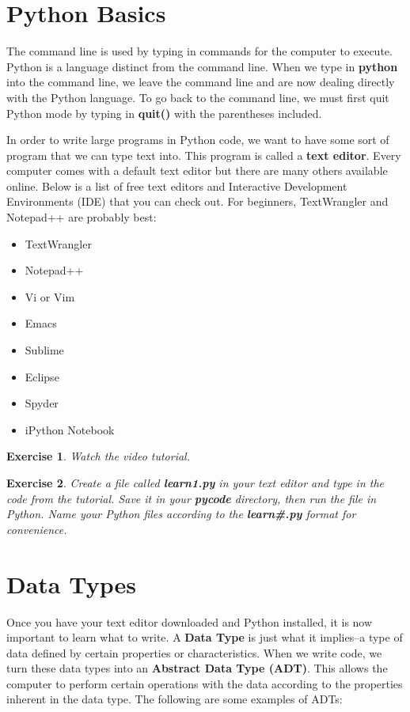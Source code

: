 \documentclass[12pt]{amsart}
\newtheorem{quest}{Exercise}
\theoremstyle{definition}
\begin{document}
\section{Python Basics}

The command line is used by typing in commands for the computer to execute. Python is a language distinct from the command line. When we type in \textbf{python} into the command line, we leave the command line and are now dealing directly with the Python language. To go back to the command line, we must first quit Python mode by typing in \textbf{quit()} with the parentheses included.

In order to write large programs in Python code, we want to have some sort of program that we can type text into. This program is called a \textbf{text editor}. Every computer comes with a default text editor but there are many others available online. Below is a list of free text editors and Interactive Development Environments (IDE) that you can check out. For beginners, TextWrangler and Notepad++ are probably best:

\begin{itemize}
  \item TextWrangler
  \item Notepad++
  \item Vi or Vim
  \item Emacs
  \item Sublime
  \item Eclipse
  \item Spyder
  \item iPython Notebook
\end{itemize}

\begin{quest}
Watch the video tutorial.
\end{quest}
\begin{quest}
Create a file called \textbf{learn1.py} in your text editor and type in the code from the tutorial. Save it in your \textbf{pycode} directory, then run the file in Python. Name your Python files according to the \textbf{learn\#.py} format for convenience.
\end{quest}

\section{Data Types}%

Once you have your text editor downloaded and Python installed, it is now important to learn what to write. A \textbf{Data Type} is just what it implies--a type of data defined by certain properties or characteristics. When we write code, we turn these data types into an \textbf{Abstract Data Type (ADT)}. This allows the computer to perform certain operations with the data according to the properties inherent in the data type. The following are some examples of ADTs:
\end{document}
